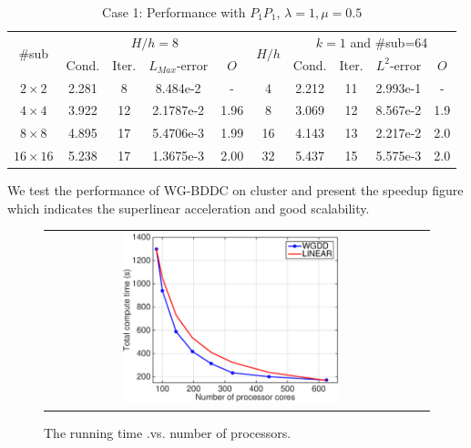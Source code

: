 			\begin{table}[h]
				\small
				\vspace{-10pt}
				\setlength{\tabcolsep}{1pt} {
					\caption{Case 1: Performance with $P_{1}P_{1}$, $ \lambda = 1, \mu = 0.5 $}
					\label{Tab:case1_PkPkPk linear}
					\vspace{-5pt}
					\begin{center}
						\begin{tabular}{c|cccc|c|cccc}
							\hline
							\multirow{2}{*}{\#sub} &\multicolumn{4}{c|}{ $H/h=8$} &\multirow{2}{*}{$H/h$} &\multicolumn{4}{c}{$k=1$ and \#sub=64}\\ 
							& Cond.   & Iter. &$L_{Max}$-error & $O$& & Cond.   & Iter. &$L^2$-error & $O$ \\
							
							\hline
							$2\times 2$     & 2.281 & 8   & 8.484e-2 & - & 4   & 2.212 &11 & 2.993e-1 &- \\
							$4\times 4$     &3.922 &12 &2.1787e-2 & 1.96 & 8   & 3.069 &12 & 8.567e-2 & 1.9  \\
							$8\times 8$  & 4.895 &17 &5.4706e-3 & 1.99 & 16   & 4.143 &13 & 2.217e-2 & 2.0 \\
							$16\times 16$ &5.238&17 &1.3675e-3 & 2.00 & 32   & 5.437 &15 & 5.575e-3 & 2.0 \\
							\hline	
						\end{tabular}
					\end{center} }
				\end{table}
				
				We test the performance of WG-BDDC on cluster and present the speedup figure which indicates the superlinear acceleration and good scalability. 
				
				\begin{figure}[h]
					\centering
					\begin{tabular}{cc}
						\includegraphics[width=0.6\textwidth]{./pics/p1time.eps} 
					\end{tabular}
					\caption{\footnotesize The running time .vs. number of processors.}\label{fig6: time}
				\end{figure}
				
